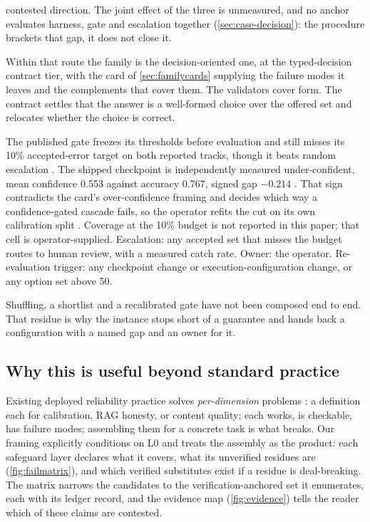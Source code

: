 \begin{description}[leftmargin=1.5em, itemsep=2pt]
  contested direction. The joint effect of the three is unmeasured, and no anchor evaluates
  harness, gate and escalation together (\cref{sec:case-decision}): the procedure brackets that
  gap, it does not close it.
\item[\textbf{5. Archetype route.}] Within that route the family is the decision-oriented one, at
  the typed-decision contract tier, with the card of \cref{sec:familycards} supplying the failure
  modes it leaves and the complements that cover them. The validators cover form. The
  contract settles that the answer is a well-formed choice over the offered set and relocates
  whether the choice is correct.
\item[\textbf{6. Budget covenant.}] The published gate freezes its thresholds before evaluation and
  still misses its 10\% accepted-error target on both reported tracks, though it beats random
  escalation . The shipped checkpoint is independently measured
  under-confident, mean confidence 0.553 against accuracy 0.767, signed gap $-0.214$
  . That sign contradicts the card's over-confidence framing and decides
  which way a confidence-gated cascade fails, so the operator refits the cut on its own calibration
  split . Coverage at the 10\% budget is not reported in this paper; that cell
  is operator-supplied. Escalation: any accepted set that misses the budget routes to human review,
  with a measured catch rate.
  Owner: the operator. Re-evaluation trigger: any checkpoint change or execution-configuration
  change, or any option set above 50.
\end{description}
Shuffling, a shortlist and a recalibrated gate have not been composed end to end. That residue is
why the instance stops short of a guarantee and hands back a configuration with a named gap and an
owner for it.

\subsection{Why this is useful beyond standard practice}
Existing deployed reliability practice solves \emph{per-dimension} problems
\cite{id250206872,id240910102,id230901219}: a definition each for calibration, RAG honesty, or content
quality; each works, is checkable, has failure modes; assembling them for a concrete task is
what breaks. Our framing explicitly conditions on L0 and treats the assembly as the product:
each safeguard layer declares what it covers, what its unverified residues are
(\cref{fig:failmatrix}), and which verified substitutes exist if a residue is deal-breaking.
The matrix narrows the candidates to the verification-anchored set it enumerates, each with its
ledger record, and the evidence map (\cref{fig:evidence}) tells the reader which of these claims
are contested.

